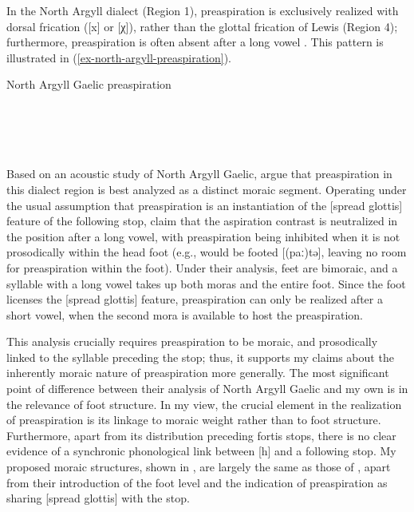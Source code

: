 \documentclass[output=paper,colorlinks,citecolor=brown]{langscibook}
\begin{document}
In the North Argyll dialect (Region 1), preaspiration is exclusively realized with dorsal frication ([x] or [χ]), rather than the glottal frication of Lewis (Region 4); furthermore, preaspiration is often absent after a long vowel \citep{iosadetal2015}. This pattern is illustrated in (\ref{ex-north-argyll-preaspiration}).

\ea North Argyll Gaelic preaspiration \citep{sgds,iosadetal2015}\label{ex-north-argyll-preaspiration}\\
\ea
  \tab\relax [kʰu{xp}an]  \tab {}\\ 	
 	\tab\relax [pʰaː{p}ə]	\tab {} \\
\ex {}	\tab\relax  [pʰu{xt}an] \tab {}\\	
 	\tab\relax  [paː{t}ə]	\tab {} \\
\ex {}	\tab\relax [pʰo{xk}ə]   \tab {}	
\z
\z

Based on an acoustic study of North Argyll Gaelic, \citet{iosadetal2015} argue that preaspiration in this dialect region is best analyzed as a distinct moraic segment. Operating under the usual assumption that preaspiration is an instantiation of the [spread glottis] feature of the following stop, \citet{iosadetal2015} claim that the aspiration contrast is neutralized in the position after a long vowel, with preaspiration being inhibited when it is not prosodically within the head foot (e.g.,  would be footed [(paː)tə], leaving no room for preaspiration within the foot). Under their analysis, feet are bimoraic, and a syllable with a long vowel takes up both moras and the entire foot. Since the foot licenses the [spread glottis] feature, preaspiration can only be realized after a short vowel, when the second mora is available to host the preaspiration. 

This analysis crucially requires preaspiration to be moraic, and prosodically linked to the syllable preceding the stop; thus, it supports my claims about the inherently moraic nature of preaspiration more generally. The most significant point of difference between their analysis of North Argyll Gaelic and my own is in the relevance of foot structure. In my view, the crucial element in the realization of preaspiration is its linkage to moraic weight rather than to foot structure. Furthermore, apart from its distribution preceding fortis stops, there is no clear evidence of a synchronic phonological link between [h] and a following stop.  
My proposed moraic structures, shown in , are largely the same as those of \citet{iosadetal2015}, apart from their introduction of the foot level and the indication of preaspiration as sharing [spread glottis] with the stop.
\end{document}
